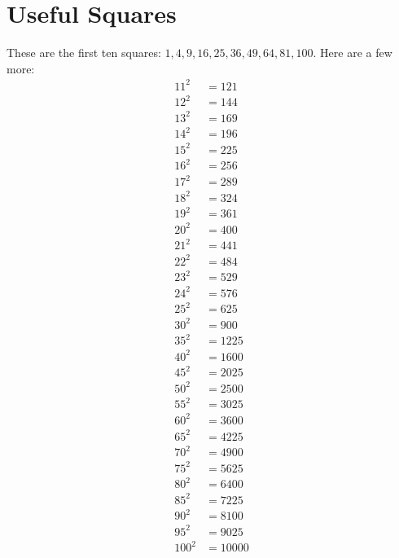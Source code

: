 \documentclass[12pt]{article}
\begin{document}
\section*{Useful Squares}
These are the first ten squares: $1, 4, 9, 16, 25, 36, 49, 64, 81, 100$. Here are a few more:
\begin{align*}
11^2  & = 121\\
12^2  & = 144\\
13^2  & = 169\\
14^2  & = 196\\
15^2  & = 225\\
16^2  & = 256\\
17^2  & = 289\\
18^2  & = 324\\
19^2  & = 361\\
20^2  & = 400\\
21^2  & = 441\\
22^2  & = 484\\
23^2  & = 529\\
24^2  & = 576\\
25^2  & = 625\\
30^2  & = 900\\
35^2  & = 1225\\
40^2  & = 1600\\
45^2  & = 2025\\
50^2  & = 2500\\
55^2  & = 3025\\
60^2  & = 3600 \\
65^2  & = 4225\\
70^2  & = 4900\\
75^2  & = 5625\\
80^2  & = 6400\\
85^2  & = 7225\\
90^2  & = 8100\\
95^2  & = 9025\\
100^2 & = 10000
\end{align*}

\newpage
\end{document}
